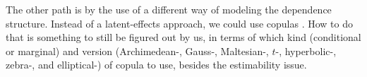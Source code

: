 The other path is by the use of a different way of modeling the
dependence structure. Instead of a latent-effects approach, we could use
copulas
\cite{copulas,semiparametricSCHEIKE,cheng&fine12,gcmr,factorcopulas}.
How to do that is something to still be figured out by us, in terms of
which kind (conditional or marginal) and version (Archimedean-, Gauss-,
Maltesian-, \(t\)-, hyperbolic-, zebra-, and elliptical-) of copula to
use, besides the estimability issue.

